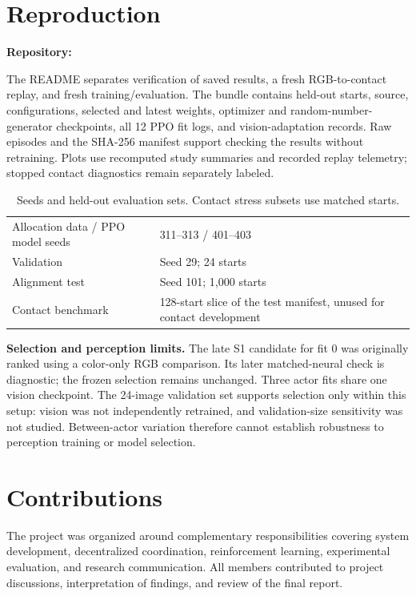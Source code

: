 \documentclass{article}
\begin{document}
\clearpage
\section{Reproduction}
\textbf{Repository:} \RepositoryLink

The README separates verification of saved results, a fresh RGB-to-contact replay, and fresh training/evaluation. The bundle contains held-out starts, source, configurations, selected and latest weights, optimizer and random-number-generator checkpoints, all 12 PPO fit logs, and vision-adaptation records. Raw episodes and the SHA-256 manifest support checking the results without retraining. Plots use recomputed study summaries and recorded replay telemetry; stopped contact diagnostics remain separately labeled.

\begin{table}[!ht]\centering
\caption{Seeds and held-out evaluation sets. Contact stress subsets use matched starts.}
\begin{tabularx}{\linewidth}{@{}lX@{}}\toprule
Allocation data / PPO model seeds & 311--313 / 401--403 \\
Validation & Seed 29; 24 starts \\
Alignment test & Seed 101; 1,000 starts \\
Contact benchmark & 128-start slice of the test manifest, unused for contact development \\
\bottomrule\end{tabularx}
\end{table}

\textbf{Selection and perception limits.} The late S1 candidate for fit 0 was originally ranked using a color-only RGB comparison. Its later matched-neural check is diagnostic; the frozen selection remains unchanged. Three actor fits share one vision checkpoint. The 24-image validation set supports selection only within this setup: vision was not independently retrained, and validation-size sensitivity was not studied. Between-actor variation therefore cannot establish robustness to perception training or model selection.

\section{Contributions}
The project was organized around complementary responsibilities covering system development, decentralized coordination, reinforcement learning, experimental evaluation, and research communication. All members contributed to project discussions, interpretation of findings, and review of the final report.
\end{document}
